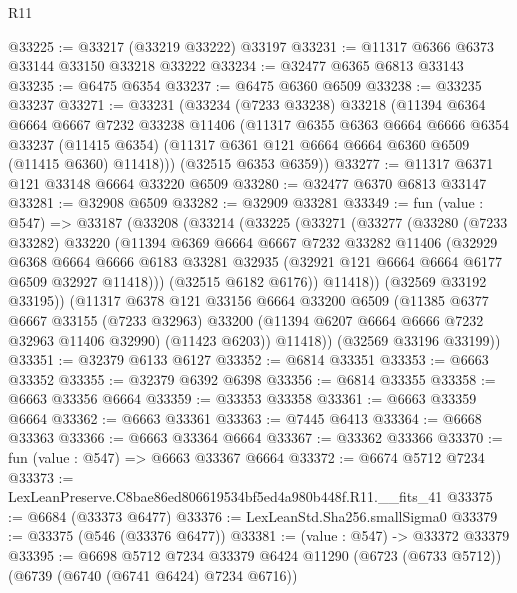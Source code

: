\begin{lexlean}{R11}
\begin{coremodule}
@33225 := @33217 (@33219 @33222) @33197
@33231 := @11317 @6366 @6373 @33144 @33150 @33218 @33222
@33234 := @32477 @6365 @6813 @33143
@33235 := @6475 @6354
@33237 := @6475 @6360 @6509
@33238 := @33235 @33237
@33271 := @33231
    (@33234
      (@7233 @33238)
      @33218
      (@11394
        @6364
        @6664
        @6667
        @7232
        @33238
        @11406
        (@11317
          @6355
          @6363
          @6664
          @6666
          @6354
          @33237
          (@11415 @6354)
          (@11317 @6361 @121 @6664 @6664 @6360 @6509 (@11415 @6360) @11418)))
      (@32515 @6353 @6359))
@33277 := @11317 @6371 @121 @33148 @6664 @33220 @6509
@33280 := @32477 @6370 @6813 @33147
@33281 := @32908 @6509
@33282 := @32909 @33281
@33349 := fun (value : @547) =>
  @33187
    (@33208
      (@33214
        (@33225
          (@33271
            (@33277
              (@33280
                (@7233 @33282)
                @33220
                (@11394
                  @6369
                  @6664
                  @6667
                  @7232
                  @33282
                  @11406
                  (@32929
                    @6368
                    @6664
                    @6666
                    @6183
                    @33281
                    @32935
                    (@32921 @121 @6664 @6664 @6177 @6509 @32927 @11418)))
                (@32515 @6182 @6176))
              @11418))
          (@32569 @33192 @33195))
        (@11317
          @6378
          @121
          @33156
          @6664
          @33200
          @6509
          (@11385
            @6377
            @6667
            @33155
            (@7233 @32963)
            @33200
            (@11394 @6207 @6664 @6666 @7232 @32963 @11406 @32990)
            (@11423 @6203))
          @11418))
      (@32569 @33196 @33199))
@33351 := @32379 @6133 @6127
@33352 := @6814 @33351
@33353 := @6663 @33352
@33355 := @32379 @6392 @6398
@33356 := @6814 @33355
@33358 := @6663 @33356 @6664
@33359 := @33353 @33358
@33361 := @6663 @33359 @6664
@33362 := @6663 @33361
@33363 := @7445 @6413
@33364 := @6668 @33363
@33366 := @6663 @33364 @6664
@33367 := @33362 @33366
@33370 := fun (value : @547) => @6663 @33367 @6664
@33372 := @6674 @5712 @7234
@33373 := LexLeanPreserve.C8bae86ed806619534bf5ed4a980b448f.R11.__fits_41
@33375 := @6684 (@33373 @6477)
@33376 := LexLeanStd.Sha256.smallSigma0
@33379 := @33375 (@546 (@33376 @6477))
@33381 := (value : @547) -> @33372 @33379
@33395 := @6698
    @5712
    @7234
    @33379
    @6424
    @11290
    (@6723 (@6733 @5712))
    (@6739 (@6740 (@6741 @6424) @7234 @6716))

\end{coremodule}
\end{lexlean}
